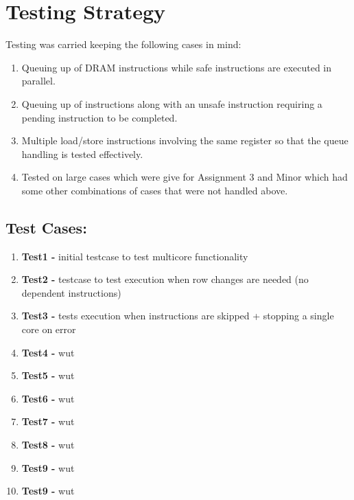 \documentclass{article}
\begin{document}
\section{Testing Strategy}

Testing was carried keeping the following cases in mind:
\begin{enumerate}
    \item Queuing up of DRAM instructions while safe instructions are executed in parallel.
    \item Queuing up of instructions along with an unsafe instruction requiring a pending instruction to be completed.
    \item Multiple load/store instructions involving the same register so that the queue handling is tested effectively.
    \item Tested on large cases which were give for Assignment 3 and Minor which had some other combinations of cases that were not handled above.
\end{enumerate}
\subsection*{Test Cases:}
\begin{enumerate}
    \item \textbf{Test1 -} initial testcase to test multicore functionality
    \item \textbf{Test2 -} testcase to test execution when row changes are needed (no dependent instructions)
%
    \item \textbf{Test3 -} tests execution when instructions are skipped + stopping a single core on error
%
    \item \textbf{Test4 -} wut
%
    \item \textbf{Test5 -} wut
%
    \item \textbf{Test6 -} wut
%
    \item \textbf{Test7 -} wut
%
    \item \textbf{Test8 -} wut
%
    \item \textbf{Test9 -} wut
%
    \item \textbf{Test9 -} wut
\end{enumerate}
\end{document}
